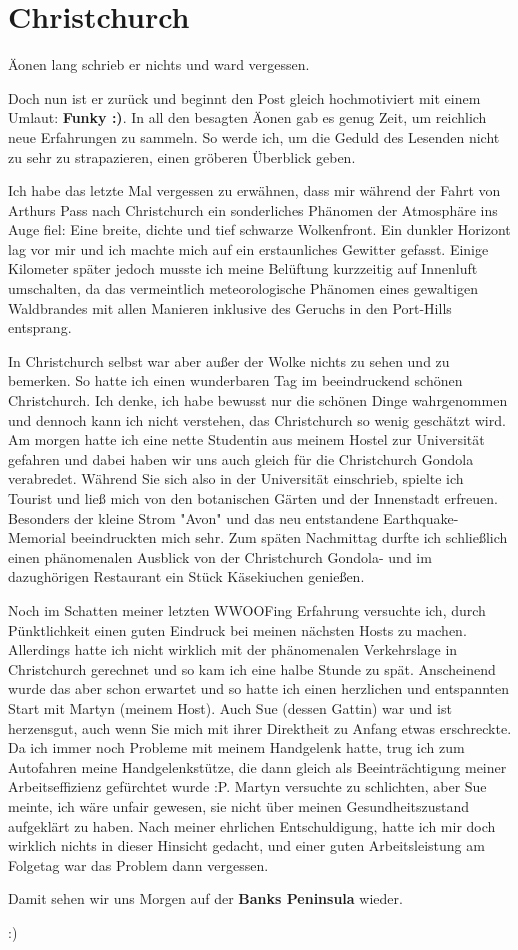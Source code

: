 \chapter{Christchurch}

Äonen lang schrieb er nichts und ward vergessen.

Doch nun ist er zurück und beginnt den Post gleich hochmotiviert mit
einem Umlaut: \textbf{\textbf{Funky :)}}. In all den besagten Äonen gab
es genug Zeit, um reichlich neue Erfahrungen zu sammeln. So werde ich,
um die Geduld des Lesenden nicht zu sehr zu strapazieren, einen gröberen
Überblick geben.

Ich habe das letzte Mal vergessen zu erwähnen, dass mir während der
Fahrt von Arthurs Pass nach Christchurch ein sonderliches Phänomen der
Atmosphäre ins Auge fiel: Eine breite, dichte und tief schwarze
Wolkenfront. Ein dunkler Horizont lag vor mir und ich machte mich auf
ein erstaunliches Gewitter gefasst. Einige Kilometer später jedoch
musste ich meine Belüftung kurzzeitig auf Innenluft umschalten, da das
vermeintlich meteorologische Phänomen eines gewaltigen Waldbrandes mit
allen Manieren inklusive des Geruchs in den Port-Hills entsprang.

In Christchurch selbst war aber außer der Wolke nichts zu sehen und zu
bemerken. So hatte ich einen wunderbaren Tag im beeindruckend schönen
Christchurch. Ich denke, ich habe bewusst nur die schönen Dinge
wahrgenommen und dennoch kann ich nicht verstehen, das Christchurch so
wenig geschätzt wird. Am morgen hatte ich eine nette Studentin aus
meinem Hostel zur Universität gefahren und dabei haben wir uns auch
gleich für die Christchurch Gondola verabredet. Während Sie sich also in
der Universität einschrieb, spielte ich Tourist und ließ mich von den
botanischen Gärten und der Innenstadt erfreuen. Besonders der kleine
Strom "Avon" und das neu entstandene Earthquake-Memorial beeindruckten
mich sehr. Zum späten Nachmittag durfte ich schließlich einen
phänomenalen Ausblick von der Christchurch Gondola- und im dazughörigen
Restaurant ein Stück Käsekiuchen genießen.

Noch im Schatten meiner letzten WWOOFing Erfahrung versuchte ich, durch
Pünktlichkeit einen guten Eindruck bei meinen nächsten Hosts zu machen.
Allerdings hatte ich nicht wirklich mit der phänomenalen Verkehrslage in
Christchurch gerechnet und so kam ich eine halbe Stunde zu spät.
Anscheinend wurde das aber schon erwartet und so hatte ich einen
herzlichen und entspannten Start mit Martyn (meinem Host). Auch Sue
(dessen Gattin) war und ist herzensgut, auch wenn Sie mich mit ihrer
Direktheit zu Anfang etwas erschreckte. Da ich immer noch Probleme mit
meinem Handgelenk hatte, trug ich zum Autofahren meine Handgelenkstütze,
die dann gleich als Beeinträchtigung meiner Arbeitseffizienz gefürchtet
wurde :P. Martyn versuchte zu schlichten, aber Sue meinte, ich wäre
unfair gewesen, sie nicht über meinen Gesundheitszustand aufgeklärt zu
haben. Nach meiner ehrlichen Entschuldigung, hatte ich mir doch wirklich
nichts in dieser Hinsicht gedacht, und einer guten Arbeitsleistung am
Folgetag war das Problem dann vergessen.

Damit sehen wir uns Morgen auf der \textbf{Banks Peninsula} wieder.

:)
